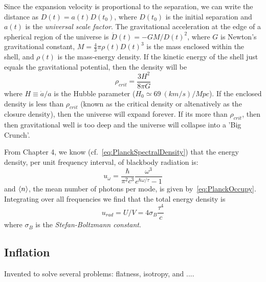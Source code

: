 Since the expansion velocity is proportional to the separation, we 
can write the distance as $D(t) = a(t) D(t_0)$, where $D(t_0)$ is 
the initial separation and $a(t)$ is the \textit{universal scale factor}.
The gravitational acceleration at the edge of a spherical region of
the universe is $\ddot{D}(t) = -G M / D(t)^2$, where $G$ is Newton's gravitational constant, $M = \frac{4}{3} \pi \rho(t) D(t)^3$ is the mass enclosed within the shell, and $\rho(t)$ is the mass-energy density. If the kinetic energy of the shell just equals the gravitational potential, then the density will be
\begin{equation}
\rho_{crit} = \frac{3 H^2}{8 \pi G}
\label{eq:CriticalDensity}
\end{equation}
where $H \equiv \dot{a}/a$ is the Hubble parameter ($H_0 \simeq 69~(km/s)/Mpc$). If the enclosed density is less than $\rho_{crit}$ (known as the critical density or altenatively as the closure density), then the universe will expand forever. If its more than $\rho_{crit}$, then then gravitational well is too deep and the universe will collapse into a 'Big Crunch'.

From Chapter 4, we know (cf.~\cref{eq:PlanckSpectralDensity}) that the energy density, per unit frequency interval, of blackbody radiation is:
\begin{equation}
u_{\omega} = \frac{\hbar}{\pi^2 c^3} \frac{\omega^3}{e^{\hbar \omega/\tau} - 1}
\end{equation}
and $\Braket{n}$, the mean number of photons per mode, is given by~\cref{eq:PlanckOccupy}. Integrating over all frequencies we find that the total energy density is
\begin{equation}
u_{rad} = U/V = 4 \sigma_B \frac{\tau^4}{c}
\end{equation}
where $\sigma_B$ is the \textit{Stefan-Boltzmann constant}. 







\subsection{Inflation}
Invented to solve several problems: flatness, isotropy, and ....



